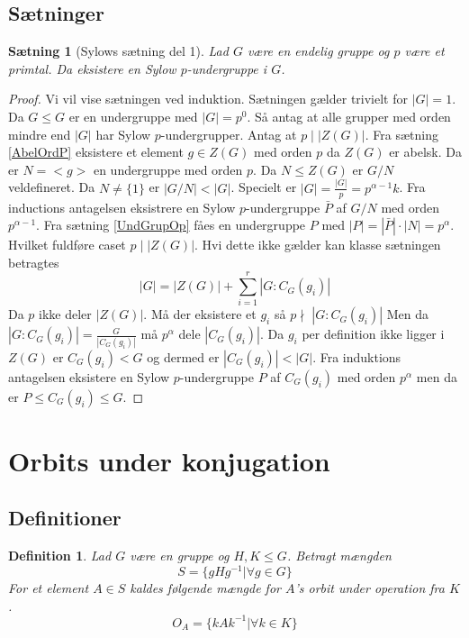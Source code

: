 \documentclass{article}
\newcommand{\inv}{^{-1}}
\newtheorem{setn}{Sætning}
\newtheorem{defi}{Definition}
\begin{document}
		\subsection*{Sætninger}
		\begin{setn}[Sylows sætning del 1]
			Lad $G$ være en endelig gruppe og $p$ være et primtal.
			Da eksistere en Sylow $p$-undergruppe i $G$.
		\end{setn}
		\begin{proof}
			Vi vil vise sætningen ved induktion. Sætningen gælder trivielt for $|G|=1$.
			Da $G \le G$ er en undergruppe med $|G| = p^0$.
			Så antag at alle grupper med orden mindre end $|G|$ har Sylow $p$-undergrupper.
			Antag at $p \; \Big | \; |Z(G)|$. Fra sætning \ref{AbelOrdP} eksistere et element
			$g \in Z(G)$ med orden $p$ da $Z(G)$ er abelsk. Da er $N = <g>$ en undergruppe med
			orden $p$. Da $N \le Z(G)$ er $G/N$ veldefineret.
			Da $N \ne \{1\}$ er $|G/N| < |G|$. Specielt er $|G| = \frac{|G|}{p} = p^{\alpha-1}k$.
			Fra inductions antagelsen eksistrere en Sylow $p$-undergruppe $\bar{P}$ af $G/N$
			med orden $p^{\alpha-1}$. Fra sætning \ref{UndGrupOp} fåes en undergruppe $P$
			med $|P| = |\bar{P}|\cdot|N| = p^\alpha$. Hvilket fuldføre caset $p \;\Big |\;|Z(G)|$.
			Hvi dette ikke gælder kan klasse sætningen betragtes
			$$|G| = |Z(G)| + \sum_{i=1}^r|G:C_G(g_i)|$$
			Da $p$ ikke deler $|Z(G)|$. Må der eksistere et $g_i$ så $p \nmid \; |G:C_G(g_i)|$
			Men da $|G:C_G(g_i)| = \frac{G}{|C_G(g_i)|}$ må $p^\alpha$ dele $|C_G(g_i)|$.
			Da $g_i$ per definition ikke ligger i $Z(G)$ er $C_G(g_i) < G$ og dermed
			er $|C_G(g_i)| < |G|$. Fra induktions antagelsen eksistere en Sylow $p$-undergruppe
			$P$ af $C_G(g_i)$ med orden $p^\alpha$ men da er $P \le C_G(g_i) \le G$.
		\end{proof}
	\newpage
	\section*{Orbits under konjugation}
		\subsection*{Definitioner}
		\begin{defi}
			Lad $G$ være en gruppe og $H,K \le G$. Betragt mængden
			$$S = \{gHg\inv| \forall g \in G\}$$
			For et element $A \in S$ kaldes følgende mængde for
			$A$'s orbit under operation fra $K$.
			$$O_A = \{kAk\inv| \forall k \in K\}$$
		\end{defi}
\end{document}
